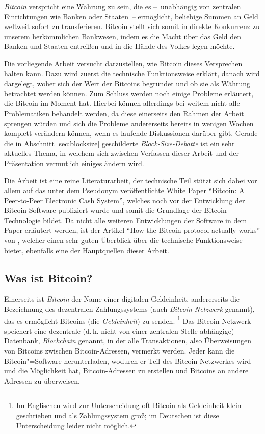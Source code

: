 \emph{Bitcoin} verspricht eine Währung zu sein, die es --~unabhängig von zentralen Einrichtungen wie Banken oder Staaten~-- ermöglicht, beliebige Summen an Geld weltweit sofort zu transferieren.
Bitcoin stellt sich somit in direkte Konkurrenz zu unserem herkömmlichen Bankwesen, indem es die Macht über das Geld den Banken und Staaten entreißen und in die Hände des Volkes legen möchte.

Die vorliegende Arbeit versucht darzustellen, wie Bitcoin dieses Versprechen halten kann.
Dazu wird zuerst die technische Funktionsweise erklärt, danach wird dargelegt, woher sich der Wert der Bitcoins begründet und ob sie als Währung betrachtet werden können.
Zum Schluss werden noch einige Probleme erläutert, die Bitcoin im Moment hat.
Hierbei können allerdings bei weitem nicht alle Problematiken behandelt werden, da diese einerseits den Rahmen der Arbeit sprengen würden und sich die Probleme andererseits bereits in wenigen Wochen komplett verändern können, wenn es laufende Diskussionen darüber gibt.
Gerade die in Abschnitt \ref{sec:blocksize} geschilderte \emph{Block-Size-Debatte} ist ein sehr aktuelles Thema, in welchem sich zwischen Verfassen dieser Arbeit und der Präsentation vermutlich einiges ändern wird.

Die Arbeit ist eine reine Literaturarbeit, der technische Teil stützt sich dabei vor allem auf das unter dem Pseudonym  veröffentlichte White Paper "`Bitcoin: A Peer-to-Peer Electronic Cash System"', welches noch vor der Entwicklung der Bitcoin-Software publiziert wurde und somit die Grundlage der Bitcoin-Technologie bildet. \parencite{nakamoto}
Da nicht alle weiteren Entwicklungen der Software in dem Paper erläutert werden, ist der Artikel "`How the Bitcoin protocol actually works"' von , welcher einen sehr guten Überblick über die technische Funktionsweise bietet, ebenfalls eine der Hauptquellen dieser Arbeit. \parencite{nielsen}

\subsection{Was ist Bitcoin?}
\label{sec:bitcoinintro}

Einerseits ist \emph{Bitcoin} der Name einer digitalen Geldeinheit, andererseits die Bezeichnung des dezentralen Zahlungssystems (auch \emph{Bitcoin-Netzwerk} genannt), das es ermöglicht Bitcoins (die \emph{Geldeinheit}) zu senden.%
\footnote{Im Englischen wird zur Unterscheidung oft Bitcoin als Geldeinheit klein geschrieben und als Zahlungssystem groß; im Deutschen ist diese Unterscheidung leider nicht möglich.}
Das Bitcoin-Netzwerk speichert eine dezentrale (d.\,h. nicht von einer zentralen Stelle abhängige) Datenbank, \emph{Blockchain} genannt, in der alle Transaktionen, also Überweisungen von Bitcoins zwischen Bitcoin-Adressen, vermerkt werden.
Jeder kann die Bitcoin"=Software herunterladen, wodurch er Teil des Bitcoin-Netzwerkes wird und die Möglichkeit hat, Bitcoin-Adressen zu erstellen und Bitcoins an andere Adressen zu überweisen.
